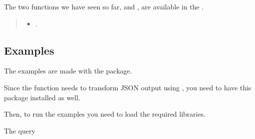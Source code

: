 \documentclass[a4paper,12pt,english]{sphinxhowto}
\begin{document}
The two functions we have seen so far,  and ,
are available in the {\hyperref[\detokenize{sdam:sdam-pkg}]{}}.

\begin{quote}



\begin{itemize}
\item {} 
{\hyperref[\detokenize{sdam:sdam-inst}]{}}.

\end{itemize}


\end{quote}



\subsection{Examples}
\label{\detokenize{Epigraphic:examples}}
The examples are made with the   package.

Since  the  function needs to transform JSON output using ,
you need to have this package installed as well.


Then, to run the examples you need to load the required libraries.

\begin{sphinxVerbatim}[commandchars=\\\{\},formatcom=\footnotesize]
 
   
\end{sphinxVerbatim}


The query

\begin{sphinxVerbatim}[commandchars=\\\{\},formatcom=\footnotesize]
 
\end{sphinxVerbatim}
\end{document}

